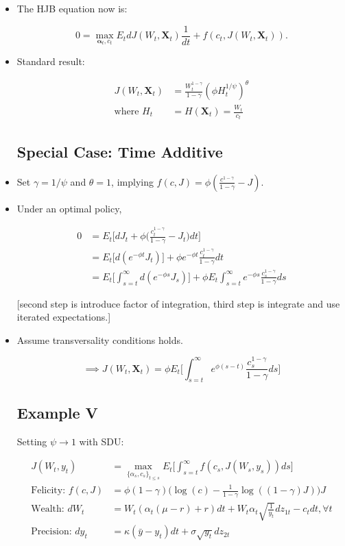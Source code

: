 \documentclass{article}
\newcommand{\Xbf}{\mathbf{X}}
\newcommand{\alphabf}{\boldsymbol{\alpha}}
\begin{document}
\begin{itemize}
\item The HJB equation now is:

$$
0 = \max_{\alphabf_t, c_t} E_t dJ(W_t, \Xbf_t)\frac{1}{dt} + f(c_t, J(W_t, \Xbf_t)).
$$

\item Standard result:

\begin{align*}
J(W_t, \Xbf_t) &= \frac{W_t^{1 - \gamma}}{1 - \gamma}(\phi H_t^{1/\psi})^\theta \\
\text{where } H_t &= H(\Xbf_t) = \frac{W_t}{c_t}
\end{align*}

\subsection*{Special Case: Time Additive}

\item Set $\gamma = 1/ \psi$ and $\theta = 1$, implying $f(c, J) = \phi (\frac{c^{1-\gamma}}{1 - \gamma}-J)$.

\item Under an optimal policy,

\begin{align*}
0 
&= E_t \Bigg[ dJ_t + \phi \Bigg(\frac{c_t^{1-\gamma}}{1 - \gamma}-J_t \Bigg) dt\Bigg] \\
&= E_t \Bigg[ d(e^{-\phi t}J_t) \Bigg] + \phi e^{-\phi t} \frac{c_t^{1-\gamma}}{1 - \gamma}dt\\
&= E_t \Bigg[ \int_{s=t}^\infty d (e^{-\phi s} J_s) \Bigg] + \phi E_t \int_{s=t}^\infty e^{-\phi s} \frac{c_s^{1-\gamma}}{1 - \gamma}ds
\end{align*}

[second step is introduce factor of integration, third step is integrate and use iterated expectations.]

\item Assume transversality conditions holds.

$$
\implies J(W_t, \Xbf_t) = \phi E_t \Bigg[ \int_{s=t}^\infty e^{\phi(s-t)} \frac{c_s^{1-\gamma}}{1 - \gamma} ds\Bigg]
$$

\subsection*{Example V}

Setting $\psi \to 1$ with SDU:

\begin{align*}
J(W_t, y_t) &= \max_{\{ \alpha_s, c_s\}_{t \le s}} E_t \Bigg[ \int_{s=t}^\infty f(c_s, J(W_s, y_s)) ds\Bigg] \\
\text{Felicity: } f(c, J) &= \phi(1-\gamma) \Bigg( \log(c) - \frac{1}{1-\gamma} \log ((1 - \gamma)J)\Bigg)J\\
\text{Wealth: } dW_t &= W_t (\alpha_t(\mu - r) + r) dt + W_t \alpha_t \sqrt{\frac{1}{y_t}} dz_{1t} - c_t dt, \forall t\\
\text{Precision: } dy_t &= \kappa(\bar{y} - y_t) dt + \sigma\sqrt{y_t} dz_{2t}
\end{align*}


\end{itemize}
\end{document}
